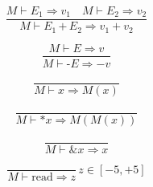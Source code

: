 \documentclass{article}
\begin{document}
\begin{displaymath}
  \frac{ M \vdash {E}_{1} \Rightarrow {v}_{1} \quad M \vdash {E}_{2} \Rightarrow {v}_{2}}{M \vdash {E}_{1} \, \textrm{+} \, {E}_{2} \Rightarrow {v}_{1} + {v}_{2}}
\end{displaymath}

\begin{displaymath}
  \frac{ M \vdash E \Rightarrow v}{M \vdash \textrm{-}E \Rightarrow -v}
\end{displaymath}

\begin{displaymath}
  \frac{ }{M \vdash x \Rightarrow M(x)}
\end{displaymath}

\begin{displaymath}
  \frac{ }{M \vdash *x \Rightarrow M(M(x))}
\end{displaymath}

\begin{displaymath}
  \frac{ }{M \vdash \&x \Rightarrow x}
\end{displaymath}

\begin{displaymath}
  \frac{ }{M \vdash \textrm{read} \Rightarrow z} \, z \in [-5, +5]
\end{displaymath}
\end{document}
